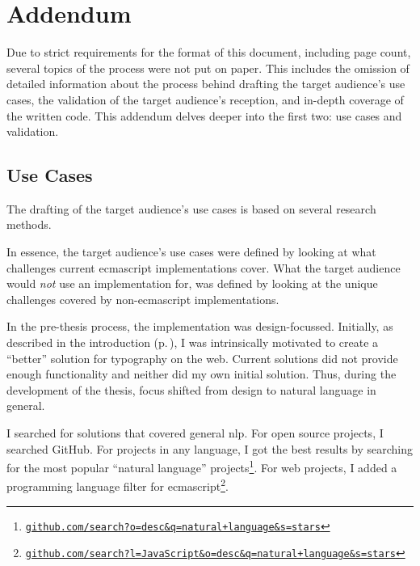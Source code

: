 
\begingroup
\let\clearpage\relax
\let\cleardoublepage\relax
\let\cleardoublepage\relax

\manualmark
{}

\chapter*{Addendum}\label{addendum}

Due to strict requirements for the format of this document, including page
  count, several topics of the process were not put on paper.
This includes the omission of detailed information about the process behind
  drafting the target audience's use cases, the validation of the
  target audience's reception, and in-depth coverage of the written code.
This addendum delves deeper into the first two: use cases and validation.

\section*{Use Cases}\label{addendum-use-cases}

The drafting of the target audience's use cases is based on several research
  methods.

In essence, the target audience's use cases were defined by looking at what
  challenges current \gls{ecmascript} implementations cover.
What the target audience would \emph{not} use an implementation for, was
  defined by looking at the unique challenges covered by non-\gls{ecmascript}
  implementations.

In the pre-thesis process, the implementation was design-focussed.
Initially, as described in the introduction (p.\,\pageref{introduction}), I
  was intrinsically motivated to create a ``better'' solution for typography
  on the web.
Current solutions did not provide enough functionality and neither did my own
  initial solution.
Thus, during the development of the thesis, focus shifted from design to
  natural language in general.

I searched for solutions that covered general \gls{nlp}.
For open source projects, I searched GitHub.
For projects in any language, I got the best results by searching for the
  most popular ``natural language'' projects\footnote{
    \href{https://github.com/search?o=desc&q=natural+language&s=stars}{\nolinkurl{github.com/search?o=desc&q=natural+language&s=stars}}
  }.
For web projects, I added a programming language filter for
  \gls{ecmascript}\footnote{
    \href{https://github.com/search?l=JavaScript&o=desc&q=natural+language&s=stars}{\nolinkurl{github.com/search?l=JavaScript&o=desc&q=natural+language&s=stars}}
  }.

